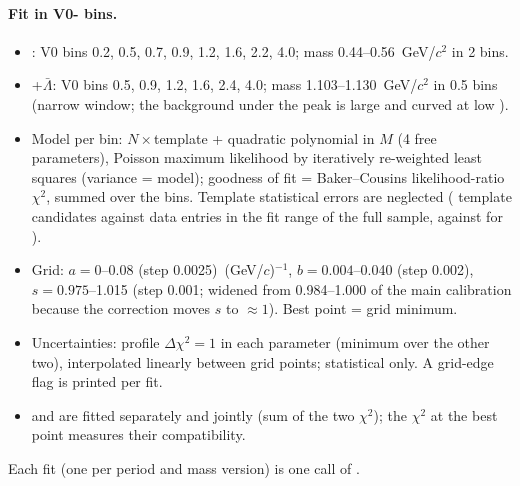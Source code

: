\paragraph{Fit in V0-\pt{} bins.}
\begin{itemize}
\item \Ks: V0 \pt{} bins 0.2, 0.5, 0.7, 0.9, 1.2, 1.6, 2.2, 4.0\gevc; mass 0.44--0.56~GeV/$c^2$ in 2\mevcc{} bins.
\item \La+$\bar\Lambda$: V0 \pt{} bins 0.5, 0.9, 1.2, 1.6, 2.4, 4.0\gevc; mass 1.103--1.130~GeV/$c^2$ in 0.5\mevcc{} bins
  (narrow window; the background under the \La{} peak is large and curved at low \pt{}).
\item Model per bin: $N\times$template + quadratic polynomial in $M$ (4 free parameters), Poisson maximum likelihood by
  iteratively re-weighted least squares (variance = model); goodness of fit = Baker--Cousins likelihood-ratio $\chi^2$, summed over
  the \pt{} bins. Template statistical errors are neglected (\TmplKs{} \Ks{} template candidates against \AllFitKs{} data entries in the fit range of the full sample, \TmplLa{} against \AllFitLa{} for \La).
\item Grid: $a=0$--0.08 (step 0.0025)~(GeV/$c$)$^{-1}$, $b=0.004$--0.040 (step 0.002), $s=0.975$--1.015 (step 0.001;
  widened from 0.984--1.000 of the main calibration because the correction moves $s$ to $\approx1$). Best point = grid minimum.
\item Uncertainties: profile $\Delta\chi^2=1$ in each parameter (minimum over the other two), interpolated linearly between grid
  points; statistical only. A grid-edge flag is printed per fit.
\item \Ks{} and \La{} are fitted separately and jointly (sum of the two $\chi^2$); the \La{} $\chi^2$ at the \Ks{} best point
  measures their compatibility.
\end{itemize}
Each fit (one per period and mass version) is one call of .

